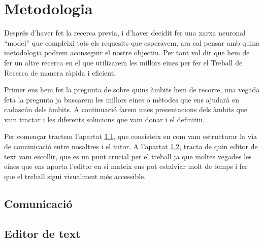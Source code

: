 \chapter{Metodologia}
Després d'haver fet la recerca previa, i d'haver decidit fer una xarxa neuronal ``model'' que compleixi tots els requesits que esperavem, ara cal pensar amb quina metodologia podrem aconseguir el nostre objectiu. Per tant vol dir que hem de fer un altre recerca en el que utilizarem les millors eines per fer el Treball de Recerca de manera ràpida i eficient.

Primer ens hem fet la pregunta de sobre quins àmbits hem de recorre, una vegada feta la pregunta ja buscarem les millors eines o mètodes que ens ajudarà en cadascún dels àmbits. A continuació farem unes presentacions dels àmbits que vam tractar i les diferents solucions que vam donar i el definitiu.

Per començar tractem  l'apartat \ref{4.1}, que consisteix en com vam estructurar la via de comunicació entre nosaltres i el tutor. A l'apartat \ref{4.2}, tracta de quin editor de text vam escollir, que es un punt crucial per el treball ja que moltes vegades les eines que ens aporta l'editor en si mateix ens pot estalviar molt de temps i fer que el treball sigui visualment més accessible.




\section{Comunicació}\label{4.1}
\section{Editor de text}\label{4.2}

